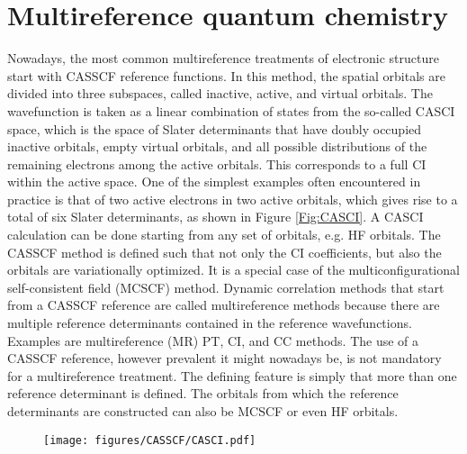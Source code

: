 \section{Multireference quantum chemistry}
Nowadays, the most common multireference treatments of electronic structure start with CASSCF\cite{RoosTS_1980_157, SiegbHRL_1980_323, SiegbAHR_1981_2384} reference functions. In this method, the spatial orbitals are divided into three subspaces, called inactive, active, and virtual orbitals. The wavefunction is taken as a linear combination of states from the so-called CASCI space, which is the space of Slater determinants that have doubly occupied inactive orbitals, empty virtual orbitals, and all possible distributions of the remaining electrons among the active orbitals. This corresponds to a full CI within the active space. One of the simplest examples often encountered in practice is that of two active electrons in two active orbitals, which gives rise to a total of six Slater determinants, as shown in Figure \ref{Fig:CASCI}. A CASCI calculation can be done starting from any set of orbitals, e.g. HF orbitals. The CASSCF method is defined such that not only the CI coefficients, but also the orbitals are variationally optimized. It is a special case of the multiconfigurational self-consistent field (MCSCF)\cite{Hinze_1973_6424} method. Dynamic correlation methods that start from a CASSCF reference are called multireference methods because there are multiple reference determinants contained in the reference wavefunctions. Examples are multireference (MR) PT, CI, and CC methods.
The use of a CASSCF reference, however prevalent it might nowadays be, is not mandatory for a multireference treatment. The defining feature is simply that more than one reference determinant is defined. The orbitals from which the reference determinants are constructed can also be MCSCF or even HF orbitals.\cite{BuenkP_1974_33, BuenkP_1975_217}
\begin{figure}
{\texttt{[image: figures/CASSCF/CASCI.pdf]}}
\end{figure}


